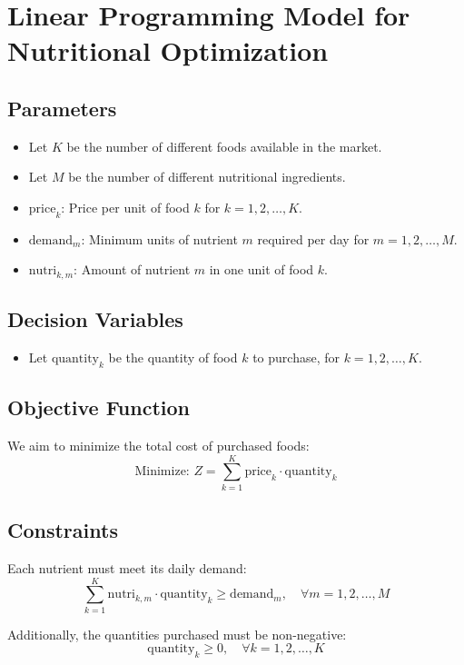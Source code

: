 \documentclass{article}
\begin{document}
\section*{Linear Programming Model for Nutritional Optimization}

\subsection*{Parameters}
\begin{itemize}
    \item Let \( K \) be the number of different foods available in the market.
    \item Let \( M \) be the number of different nutritional ingredients.
    \item \( \text{price}_{k} \): Price per unit of food \( k \) for \( k = 1, 2, \ldots, K \).
    \item \( \text{demand}_{m} \): Minimum units of nutrient \( m \) required per day for \( m = 1, 2, \ldots, M \).
    \item \( \text{nutri}_{k, m} \): Amount of nutrient \( m \) in one unit of food \( k \).
\end{itemize}

\subsection*{Decision Variables}
\begin{itemize}
    \item Let \( \text{quantity}_{k} \) be the quantity of food \( k \) to purchase, for \( k = 1, 2, \ldots, K \).
\end{itemize}

\subsection*{Objective Function}
We aim to minimize the total cost of purchased foods:
\[
\text{Minimize: } Z = \sum_{k=1}^{K} \text{price}_{k} \cdot \text{quantity}_{k}
\]

\subsection*{Constraints}
Each nutrient must meet its daily demand:
\[
\sum_{k=1}^{K} \text{nutri}_{k, m} \cdot \text{quantity}_{k} \geq \text{demand}_{m}, \quad \forall m = 1, 2, \ldots, M
\]

Additionally, the quantities purchased must be non-negative:
\[
\text{quantity}_{k} \geq 0, \quad \forall k = 1, 2, \ldots, K
\]
\end{document}
